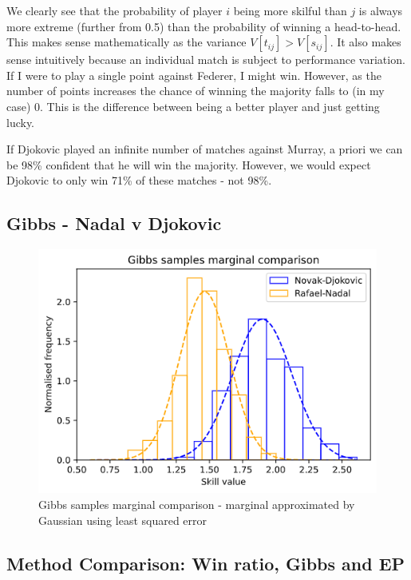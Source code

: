 \documentclass[]{article}
\newcommand{\figwidth}{0.6\linewidth}
\begin{document}
We clearly see that the probability of player $i$ being more skilful than $j$ is always more extreme (further from 0.5) than the probability of winning a head-to-head. This makes sense mathematically as the variance $V[t_{ij}] > V[s_{ij}]$. It also makes sense intuitively because an individual match is subject to performance variation. If I were to play a single point against Federer, I might win. However, as the number of points increases the chance of winning the majority falls to (in my case) 0. This is the difference between being a better player and just getting lucky.

If Djokovic played an infinite number of matches against Murray, a priori we can be 98\% confident that he will win the majority. However, we would expect Djokovic to only win 71\% of these matches - not 98\%.

\subsection{Gibbs - Nadal v Djokovic}

\begin{figure}[!h]
	\centering
	\includegraphics[width=\figwidth]{djokovic-nadal-marginal.png}
	\caption{Gibbs samples marginal comparison - marginal approximated by Gaussian using least squared error}
	\label{fig:djok-nadal-marginal}
\end{figure}



\subsection{Method Comparison: Win ratio, Gibbs and EP}
\end{document}
